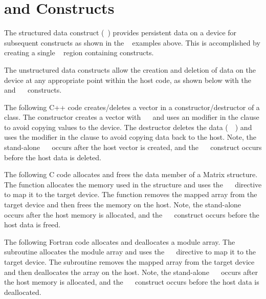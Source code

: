 \pagebreak
\section{   and    Constructs}
\label{sec:target_enter_exit_data}

The structured data construct (~) provides persistent data on a
device for subsequent  constructs as shown in the 
~ examples above. This is accomplished by creating a single
~ region containing  constructs.

The unstructured data constructs allow the creation and deletion of data on
the device at any appropriate point within the host code, as shown below 
with the ~~ and ~~ constructs.

The following C++ code creates/deletes a vector in a constructor/destructor 
of a class. The constructor creates a vector with ~~
and uses an  modifier in the  clause to avoid copying values
to the device. The destructor deletes the data (~~)
and uses the  modifier in the  clause to avoid copying data
back to the host. Note, the stand-alone ~~ occurs 
after the host vector is created, and the ~~
construct occurs before the host data is deleted.


\pagebreak
The following C code allocates and frees the data member of a Matrix structure.
The  function allocates the memory used in the structure and
uses the ~~ directive to map it to the target device. The
 function removes the mapped array from the target device
and then frees the memory on the host.  Note, the stand-alone 
~~ occurs after the host memory is allocated, and the 
~~ construct occurs before the host data is freed.


\pagebreak
The following Fortran code allocates and deallocates a module array.  The
 subroutine allocates the module array and uses the
~~ directive to map it to the target device. The
 subroutine removes the mapped array from the target device and
then deallocates the array on the host.  Note, the stand-alone 
~~ occurs after the host memory is allocated, and the 
~~ construct occurs before the host data is deallocated.


